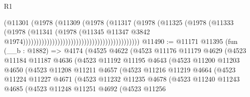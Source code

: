 \begin{lexlean}{R1}
\begin{coremodule}
                                                                  (@11301
                                                                    (@1978
                                                                      (@11309
                                                                        (@1978
                                                                          (@11317
                                                                            (@1978
                                                                              (@11325
                                                                                (@1978
                                                                                  (@11333
                                                                                    (@1978
                                                                                      (@11341
                                                                                        (@1978
                                                                                          (@11345
                                                                                            @11347
                                                                                            @3842
                                                                                            @1974))))))))))))))))))))))))))))))))))))))))))))
@11490 := @11171
    @11395
    (fun (__b : @1882) =>
    @4174
      (@4525
        @4622
        (@4523
          @11176
          @11179
          @4629
          (@4523
            @11184
            @11187
            @4636
            (@4523
              @11192
              @11195
              @4643
              (@4523
                @11200
                @11203
                @4650
                (@4523
                  @11208
                  @11211
                  @4657
                  (@4523
                    @11216
                    @11219
                    @4664
                    (@4523
                      @11224
                      @11227
                      @4671
                      (@4523
                        @11232
                        @11235
                        @4678
                        (@4523
                          @11240
                          @11243
                          @4685
                          (@4523
                            @11248
                            @11251
                            @4692
                            (@4523
                              @11256

\end{coremodule}
\end{lexlean}
